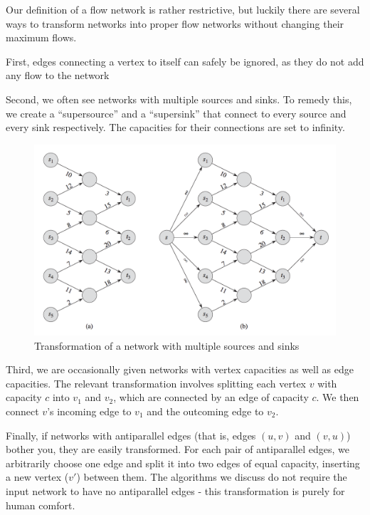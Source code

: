 \documentclass[11pt, oneside]{article}
\begin{document}
Our definition of a flow network is rather restrictive, but luckily there are several ways to transform networks into proper flow networks without changing their maximum flows.

First, edges connecting a vertex to itself can safely be ignored, as they do not add any flow to the network

Second, we often see networks with multiple sources and sinks. To remedy this, we create a ``supersource'' and a ``supersink'' that connect to every source and every sink respectively. The capacities for their connections are set to infinity.

\begin{figure}[H]
\centering
\includegraphics[scale=0.4]{supersourcesink}
\caption{Transformation of a network with multiple sources and sinks}
\end{figure}

Third, we are occasionally given networks with vertex capacities as well as edge capacities. The relevant transformation involves splitting each vertex \( v \) with capacity \( c \) into \( v_1 \) and \( v_2 \), which are connected by an edge of capacity \( c \). We then connect \( v \)'s incoming edge to \( v_1 \) and the outcoming edge to \( v_2 \).


Finally, if networks with antiparallel edges (that is, edges \( (u, v) \) and \( (v, u) \)) bother you, they are easily transformed. For each pair of antiparallel edges, we arbitrarily choose one edge and split it into two edges of equal capacity, inserting a new vertex (\( v' \)) between them. The algorithms we discuss do not require the input network to have no antiparallel edges - this transformation is purely for human comfort.
\end{document}

